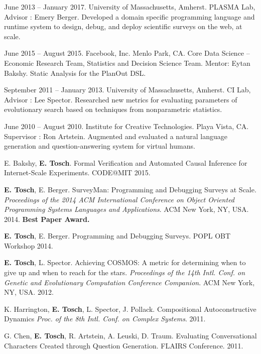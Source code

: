\documentclass[10pt]{article}
\newcommand{\cvsec}[2]{
    \begin{tcolorbox}[width=\textwidth, breakable, title={#1}]
        #2
    \end{tcolorbox}
    \vspace{10pt}
}
\begin{document}
\cvsec{Research Experience}{
  \begin{description}[leftmargin=1cm]
  \item[Research Assistant.] June 2013 -- January 2017. University of Massachusetts, Amherst. PLASMA Lab, Advisor : Emery Berger. Developed a domain specific programming language and runtime system to design, debug, and deploy scientific surveys on the web, at scale.
  \item[Research Intern.] June 2015 -- August 2015. Facebook, Inc. Menlo Park, CA. Core Data Science -- Economic Research Team, Statistics and Decision Science Team. Mentor: Eytan Bakshy. Static Analysis for the PlanOut DSL. 
  \item[Research Assistant.] September 2011 -- January 2013. University of Massachusetts, Amherst. CI Lab, Advisor : Lee Spector. Researched new metrics for evaluating parameters of evolutionary search based on techniques from nonparametric statistics.
  \item[Visiting Researcher.] June 2010 -- August 2010. Institute for Creative Technologies. Playa Vista, CA. Supervisor : Ron Artstein. Augmented and evaluated a natural language generation and question-answering system for virtual humans.
\end{description}
}

\cvsec{Publications}{
\hangindent=1cm E. Bakshy, {\bf E. Tosch}. Formal Verification and Automated Causal Inference for Internet-Scale Experiments. CODE@MIT 2015.

\hangindent=1cm {\bf E. Tosch}, E. Berger. SurveyMan: Programming and Debugging Surveys at Scale. \emph{Proceedings of the 2014 ACM International Conference on Object Oriented Programming Systems Languages and Applications}. ACM New York, NY, USA. 2014. {\bf Best Paper Award.}

\hangindent=1cm {\bf E. Tosch}, E. Berger. Programming and Debugging Surveys. POPL OBT Workshop 2014.

\hangindent=1cm {\bf E. Tosch}, L. Spector. Achieving COSMOS: A metric for determining when to give up and when to reach for the stars. \emph{Proceedings of the 14th Intl. Conf. on Genetic and Evolutionary Computation Conference Companion}. ACM New York, NY, USA. 2012.

\hangindent=1cm K. Harrington, {\bf E. Tosch}, L. Spector, J. Pollack. Compositional Autoconstructive Dynamics \emph{Proc. of the 8th Intl. Conf. on Complex Systems}. 2011.

\hangindent=1cm G. Chen, {\bf E. Tosch}, R. Artstein, A. Leuski, D. Traum. Evaluating Conversational Characters Created through Question Generation. FLAIRS Conference. 2011.
}
\end{document}
